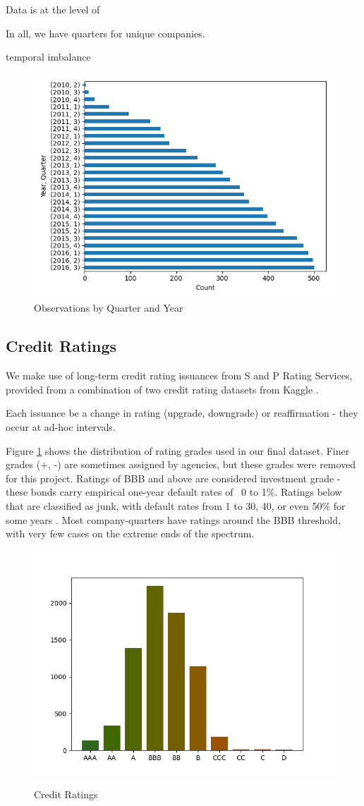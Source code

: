 \documentclass{article}
\begin{document}
    Data is at the level of

    In all, we have \numQuarters \space quarters for \numCompanies \space unique companies.

    temporal imbalance

    \begin{figure}[h!]
		\centering
        \caption{Observations by Quarter and Year}
        \includegraphics[width=0.5\linewidth,keepaspectratio=true]{../Output/All Data EDA/Tabular EDA/all_data_fixed_quarter_dates_obs_by_year_quarter_no_title.png}
	\end{figure}

    \subsection*{Credit Ratings}

    We make use of long-term credit rating issuances from S and P Rating Services, provided from a combination of two credit rating datasets from Kaggle \citep{gewerc_corporate_2020,makwana_corporate_2022}.

    Each issuance be a change in rating (upgrade, downgrade) or reaffirmation - they occur at ad-hoc intervals.

    Figure \ref{fig:credit-ratings} shows the distribution of rating grades used in our final dataset. Finer grades (+, -) are sometimes assigned by agencies, but these grades were removed for this project. Ratings of BBB and above are considered investment grade - these bonds carry empirical one-year default rates of ~0 to 1\%. Ratings below that are classified as junk, with default rates from 1 to 30, 40, or even 50\% for some years \citep{s_and_p_global_ratings_s_2024}. Most company-quarters have ratings around the BBB threshold, with very few cases on the extreme ends of the spectrum.

    \begin{figure}[h!]
		\centering
        \caption{Credit Ratings}
        \includegraphics[width=0.5\linewidth,keepaspectratio=true]{../Output/All Data EDA/Tabular EDA/Distribution of Rating Issuances_no_title.png}
        \label{fig:credit-ratings}
	\end{figure}
\end{document}
